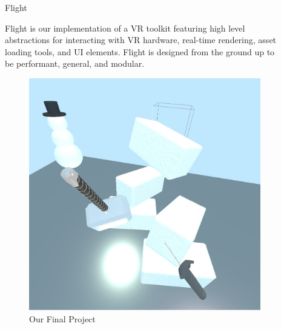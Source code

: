 \documentclass[final]{beamer}
\newlength{\sepwid}
\newlength{\onecolwid}
\begin{document}
\begin{frame}[t]
\begin{columns}[t]
\begin{column}{\onecolwid}
            \end{column} %

            \begin{column}{\sepwid}\end{column} %

            \begin{column}{\onecolwid} %

                \begin{block}{Flight}
                    \setlength{\parskip}{0.5em}

                    Flight is our implementation of a VR toolkit featuring high
                    level abstractions for interacting with VR hardware,
                    real-time rendering, asset loading tools, and UI elements.
                    Flight is designed from the ground up to be performant,
                    general, and modular.

                \end{block}

                \begin{figure}[H]
                    \centering
                    \includegraphics[width=0.9\linewidth]{../report/screenshots/physics_b.jpg}
                    \caption{Our Final Project}\label{fig:project}
                \end{figure}


\end{column}
\end{columns}
\end{frame}
\end{document}

